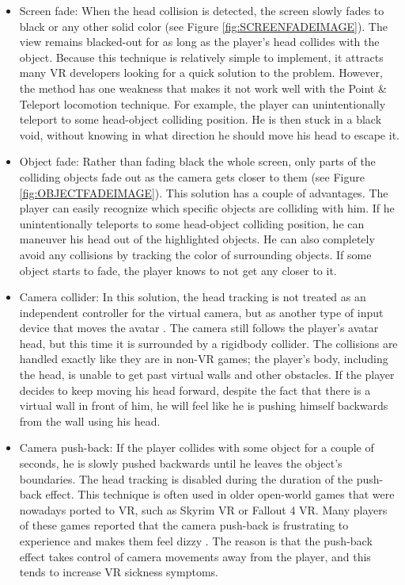 \begin{itemize}
\item Screen fade: When the head collision is detected, the screen slowly fades to black or any other solid color (see Figure \ref{fig:SCREENFADEIMAGE}). The view remains blacked-out for as long as the player's head collides with the object. Because this technique is relatively simple to implement, it attracts many VR developers looking for a quick solution to the problem. However, the method has one weakness that makes it not work well with the Point \& Teleport locomotion technique. For example, the player can unintentionally teleport to some head-object colliding position. He is then stuck in a black void, without knowing in what direction he should move his head to escape it.

\item Object fade: Rather than fading black the whole screen, only parts of the colliding objects fade out as the camera gets closer to them (see Figure \ref{fig:OBJECTFADEIMAGE}). This solution has a couple of advantages. The player can easily recognize which specific objects are colliding with him. If he unintentionally teleports to some head-object colliding position, he can maneuver his head out of the highlighted objects. He can also completely avoid any collisions by tracking the color of surrounding objects. If some object starts to fade, the player knows to not get any closer to it.

\item Camera collider: In this solution, the head tracking is not treated as an independent controller for the virtual camera, but as another type of input device that moves the avatar \cite{CAMERACOLLIDER}. The camera still follows the player's avatar head, but this time it is surrounded by a rigidbody collider. The collisions are handled exactly like they are in non-VR games; the player's body, including the head, is unable to get past virtual walls and other obstacles. If the player decides to keep moving his head forward, despite the fact that there is a virtual wall in front of him, he will feel like he is pushing himself backwards from the wall using his head.

\item Camera push-back: If the player collides with some object for a couple of seconds, he is slowly pushed backwards until he leaves the object's boundaries. The head tracking is disabled during the duration of the push-back effect. This technique is often used in older open-world games that were nowadays ported to VR, such as Skyrim VR or Fallout 4 VR. Many players of these games reported that the camera push-back is frustrating to experience and makes them feel dizzy \cite{redditfallout}\cite{SKYRIMVRPUSHBACK}\cite{PUSHBACKFEEDBACK}. The reason is that the push-back effect takes control of camera movements away from the player, and this tends to increase VR sickness symptoms.
\end{itemize}

